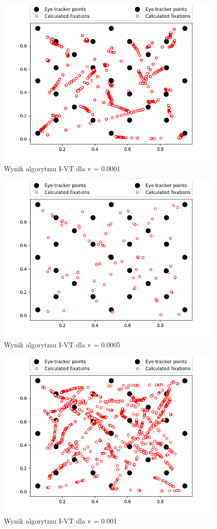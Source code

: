 \begin{figure}[H]
    \centering
    \captionsetup{justification=centering,margin=2cm}
    \includegraphics[width=0.8\linewidth]{resources/ivtresults/file1.png}
    \caption{Wynik algorytmu I-VT dla v = 0.0001}
    \label{fig:ivt1}
\end{figure}
\begin{figure}[H]
    \centering
    \captionsetup{justification=centering,margin=2cm}
    \includegraphics[width=0.8\linewidth]{resources/ivtresults/file2.png}
    \caption{Wynik algorytmu I-VT dla v = 0.0005}
    \label{fig:ivt2}
\end{figure}
\begin{figure}[H]
    \centering
    \captionsetup{justification=centering,margin=2cm}
    \includegraphics[width=0.8\linewidth]{resources/ivtresults/file3.png}
    \caption{Wynik algorytmu I-VT dla v = 0.001}
    \label{fig:ivt3}
\end{figure}
